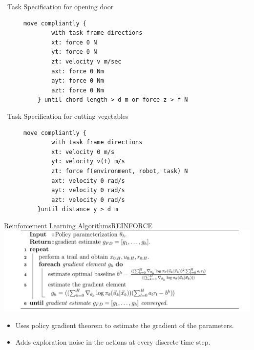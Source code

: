 \documentclass[aspectratio=43,10pt,fleqn,t]{beamer}
\begin{document}
\begin{frame}[fragile]{~}{Task Specification for opening door}
\begin{figure}
\begin{lstlisting}[label=tff-open-door-a,caption=Task Specification using TFF: Open Door]
    move compliantly {
        with task frame directions
        xt: force 0 N
        yt: force 0 N
        zt: velocity v m/sec
        axt: force 0 Nm
        ayt: force 0 Nm
        azt: force 0 Nm
    } until chord length > d m or force z > f N
\end{lstlisting}
	\end{figure}
\end{frame}

\begin{frame}[fragile]{~}{Task Specification for cutting vegetables}
		\begin{figure}
\begin{lstlisting}[label=cut_vegies,caption=Cut vegetables]
    move compliantly {
        with task frame directions
        xt: velocity 0 m/s 
        yt: velocity v(t) m/s
        zt: force f(environment, robot, task) N
        axt: velocity 0 rad/s
        ayt: velocity 0 rad/s
        azt: velocity 0 rad/s
    }until distance y > d m			
\end{lstlisting}
		\end{figure}
\end{frame}

\begin{frame}{Reinforcement Learning Algorithms}{\small REINFORCE}
		\includegraphics[width=\textwidth]{images/reinforce}
		
		\begin{itemize}
			\small
			\item Uses policy gradient theorem to estimate the gradient of the parameters.
			\item Adds exploration noise in the actions at every discrete time step.
		\end{itemize}
\end{frame}
\end{document}
